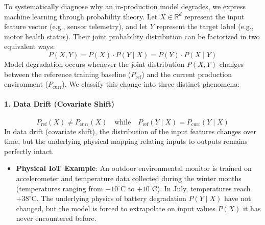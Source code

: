To systematically diagnose why an in-production model degrades, we express machine learning through probability theory. Let $X \in \mathbb{R}^d$ represent the input feature vector (e.g., sensor telemetry), and let $Y$ represent the target label (e.g., motor health status). Their joint probability distribution can be factorized in two equivalent ways:
\begin{equation}
P(X, Y) = P(X) \cdot P(Y \mid X) = P(Y) \cdot P(X \mid Y)
\end{equation}
Model degradation occurs whenever the joint distribution $P(X, Y)$ changes between the reference training baseline ($P_{\text{ref}}$) and the current production environment ($P_{\text{curr}}$). We classify this change into three distinct phenomena:

\paragraph{1. Data Drift (Covariate Shift)}
\begin{equation}
P_{\text{ref}}(X) \neq P_{\text{curr}}(X) \quad \text{while} \quad P_{\text{ref}}(Y \mid X) = P_{\text{curr}}(Y \mid X)
\end{equation}
In data drift (covariate shift), the distribution of the input features changes over time, but the underlying physical mapping relating inputs to outputs remains perfectly intact.
\begin{itemize}
    \item \textbf{Physical IoT Example}: An outdoor environmental monitor is trained on accelerometer and temperature data collected during the winter months (temperatures ranging from $-10^\circ\text{C}$ to $+10^\circ\text{C}$). In July, temperatures reach $+38^\circ\text{C}$. The underlying physics of battery degradation $P(Y \mid X)$ have not changed, but the model is forced to extrapolate on input values $P(X)$ it has never encountered before.
\end{itemize}

